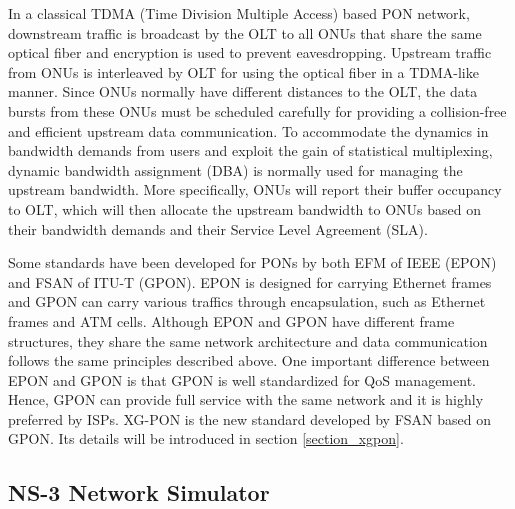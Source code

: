 


In a classical TDMA (Time Division Multiple Access) based PON
network, downstream traffic is broadcast by the OLT to all ONUs
that share the same optical fiber and encryption is used to
prevent eavesdropping. Upstream traffic from ONUs is interleaved
by OLT for using the optical fiber in a TDMA-like manner. Since
ONUs normally have different distances to the OLT, the data bursts
from these ONUs must be scheduled carefully for providing a
collision-free and efficient upstream data communication. To
accommodate the dynamics in bandwidth demands from users and
exploit the gain of statistical multiplexing, dynamic bandwidth
assignment (DBA) is normally used for managing the upstream
bandwidth. More specifically, ONUs will report their buffer
occupancy to OLT, which will then allocate the upstream bandwidth
to ONUs based on their bandwidth demands and their Service Level
Agreement (SLA).


Some standards have been developed for PONs by both EFM of IEEE
(EPON) and FSAN of ITU-T (GPON). EPON is designed for carrying
Ethernet frames and GPON can carry various traffics through
encapsulation, such as Ethernet frames and ATM cells. Although
EPON and GPON have different frame structures, they share the same
network architecture and data communication follows the same
principles described above. %
One important difference between EPON and GPON is that GPON is
well standardized for QoS management. Hence, GPON can provide full
service with the same network and it is highly preferred by ISPs.
XG-PON is the new standard developed by FSAN  based on GPON. Its
details will be introduced in section \ref{section_xgpon}.











\subsection{NS-3 Network Simulator}

